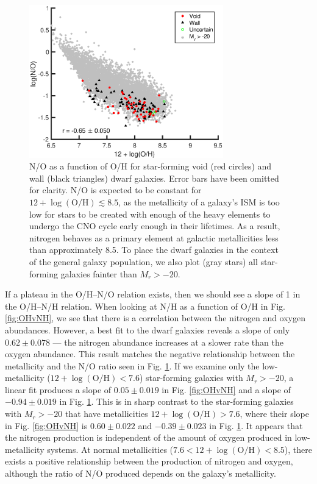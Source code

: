 \begin{figure}
    \includegraphics[width=0.75\textwidth]{Images/Paper2/1sig_I06_dwarf_0-20_SF_t3_Z12logOH_logNO}
    \caption[N/O versus metallicity of 135 dwarf galaxy sample]{N/O as a 
    function of O/H for star-forming void (red circles) and wall (black 
    triangles) dwarf galaxies.  Error bars have been omitted for clarity.  N/O 
    is expected to be constant for $12 + \log (\text{O}/\text{H}) \lesssim 8.5$, 
    as the metallicity of a galaxy's ISM is too low for stars to be created with 
    enough of the heavy elements to undergo the CNO cycle early enough in their 
    lifetimes.  As a result, nitrogen behaves as a primary element at galactic 
    metallicities less than approximately 8.5.  To place the dwarf galaxies in 
    the context of the general galaxy population, we also plot (gray stars) all 
    star-forming galaxies fainter than $M_r > -20$.}
    \label{fig:OvN}
\end{figure}

If a plateau in the O/H--N/O relation exists, then we should see a slope of 1 in 
the O/H--N/H relation.  When looking at N/H as a function of O/H in Fig. 
\ref{fig:OHvNH}, we see that there is a correlation between the nitrogen and 
oxygen abundances.  However, a best fit to the dwarf galaxies reveals a slope of 
only $0.62\pm 0.078$ --- the nitrogen abundance increases at a slower rate than 
the oxygen abundance.  This result matches the negative relationship between the 
metallicity and the N/O ratio seen in Fig. \ref{fig:OvN}.  If we examine only 
the low-metallicity ($12 + \log(\text{O}/\text{H}) < 7.6$) star-forming galaxies 
with $M_r > -20$, a linear fit produces a slope of $0.05\pm 0.019$ in Fig. 
\ref{fig:OHvNH} and a slope of $-0.94\pm 0.019$ in Fig. \ref{fig:OvN}.  This is 
in sharp contrast to the star-forming galaxies with $M_r > -20$ that have 
metallicities $12 + \log(\text{O}/\text{H}) > 7.6$, where their slope in Fig. 
\ref{fig:OHvNH} is $0.60\pm 0.022$ and $-0.39\pm 0.023$ in Fig. \ref{fig:OvN}.  
It appears that the nitrogen production is independent of the amount of oxygen 
produced in low-metallicity systems.  At normal metallicities 
($7.6 < 12 + \log(\text{O}/\text{H}) < 8.5$), there exists a positive 
relationship between the production of nitrogen and oxygen, although the ratio 
of N/O produced depends on the galaxy's metallicity.


